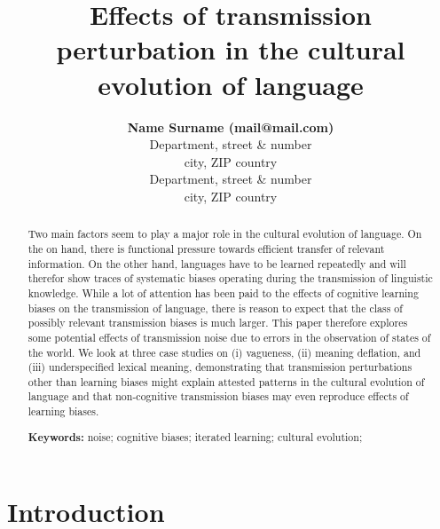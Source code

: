 \documentclass[10pt,a4paper]{article}
\title{Effects of transmission perturbation in the cultural evolution of language}
\author{{\large \bf Name Surname (mail@mail.com)} \\
  Department, street \& number \\
  city, ZIP country
  \AND {\large \bf Name Surname (mail@mail.com)} \\
  Department, street \& number \\
  city, ZIP country}
\begin{document}
\maketitle

\begin{abstract}
  Two main factors seem to play a major role in the cultural evolution of language. On the on
  hand, there is functional pressure towards efficient transfer of relevant information. On the
  other hand, languages have to be learned repeatedly and will therefor show traces of
  systematic biases operating during the transmission of linguistic knowledge. While a lot of
  attention has been paid to the effects of cognitive learning biases on the transmission of
  language, there is reason to expect that the class of possibly relevant transmission biases
  is much larger. This paper therefore explores some potential effects of transmission noise
  due to errors in the observation of states of the world. We look at three case studies on (i)
  vagueness, (ii) meaning deflation, and (iii) underspecified lexical meaning, demonstrating
  that transmission perturbations other than learning biases might explain attested patterns in
  the cultural evolution of language and that non-cognitive transmission biases may even
  reproduce effects of learning biases.

\textbf{Keywords:} 
noise; cognitive biases; iterated learning; cultural evolution;  
\end{abstract}


\section{Introduction}
\end{document}
